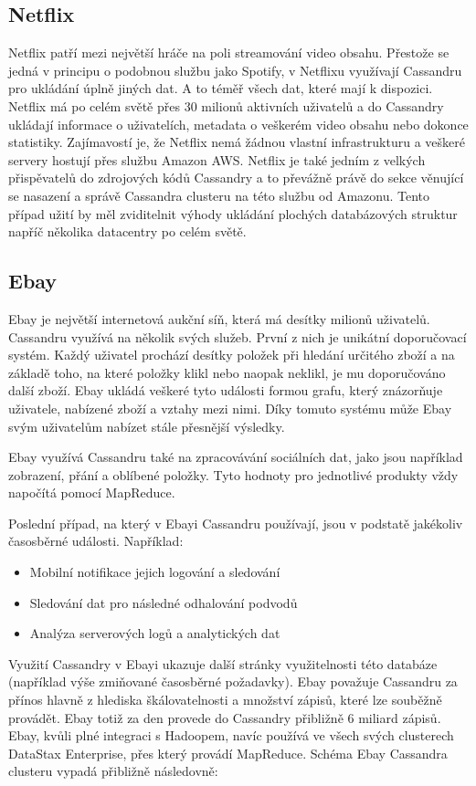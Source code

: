 \subsection{Netflix}
Netflix patří mezi největší hráče na poli streamování video obsahu. Přestože se jedná v principu o podobnou službu jako Spotify, v Netflixu využívají Cassandru pro ukládání úplně jiných dat. A to téměř všech dat, které mají k dispozici. Netflix má po celém světě přes 30 milionů aktivních uživatelů a do Cassandry ukládají informace o uživatelích, metadata o veškerém video obsahu nebo dokonce statistiky. Zajímavostí je, že Netflix nemá žádnou vlastní infrastrukturu a veškeré servery hostují přes službu Amazon AWS. Netflix je také jedním z velkých přispěvatelů do zdrojových kódů Cassandry a to převážně právě do sekce věnující se nasazení a správě Cassandra clusteru na této službu od Amazonu. Tento případ užití by měl zviditelnit výhody ukládání plochých databázových struktur napříč několika datacentry po celém světě. 

\subsection{Ebay} 
Ebay je největší internetová aukční síň, která má desítky milionů uživatelů. Cassandru využívá na několik svých služeb. První z nich je unikátní doporučovací systém. Každý uživatel prochází desítky položek při hledání určitého zboží a na základě toho, na které položky klikl nebo naopak neklikl, je mu doporučováno další zboží. Ebay ukládá veškeré tyto události formou grafu, který znázorňuje uživatele, nabízené zboží a vztahy mezi nimi. Díky tomuto systému může Ebay svým uživatelům nabízet stále přesnější výsledky. 

Ebay využívá Cassandru také na zpracovávání sociálních dat, jako jsou například zobrazení, přání a oblíbené položky. Tyto hodnoty pro jednotlivé produkty vždy napočítá pomocí MapReduce. 

Poslední případ, na který v Ebayi Cassandru používají, jsou v podstatě jakékoliv časosběrné události. Například:
\begin{itemize}
\item Mobilní notifikace jejich logování a sledování
\item Sledování dat pro následné odhalování podvodů
\item Analýza serverových logů a analytických dat
\end{itemize}

Využití Cassandry v Ebayi ukazuje další stránky využitelnosti této databáze (například výše zmiňované časosběrné požadavky). Ebay považuje Cassandru za přínos hlavně z hlediska škálovatelnosti a množství zápisů, které lze souběžně provádět. Ebay totiž za den provede do Cassandry přibližně 6 miliard zápisů.\cite{ebay} Ebay, kvůli plné integraci s Hadoopem, navíc používá ve všech svých clusterech DataStax Enterprise, přes který provádí MapReduce. Schéma Ebay Cassandra clusteru vypadá přibližně následovně:

